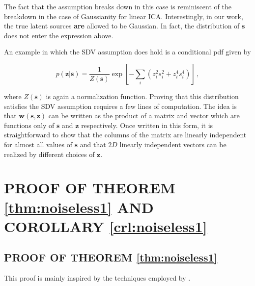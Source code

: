\documentclass[letterpaper]{article}
\theoremstyle{definition}
\begin{document}
The fact that the assumption breaks down in this case is reminiscent of the breakdown in the case of Gaussianity for linear ICA. Interestingly, in our work, the true latent sources \textbf{are} allowed to be Gaussian. In fact, the distribution of $\bm{s}$ does not enter the expression above.


An example in which the SDV assumption does hold is a conditional pdf given by

\begin{equation}
p(\bm{z}|\bm{s}) = \frac{1}{Z(\bm{s})} \exp \left[ - \sum_i (z_i^2  s_i^2 + z_i^4 s_i^4  ) \right]\,, \label{eq:satisfied}
\end{equation}

where $Z(\bm{s})$ is again a normalization function.
Proving that this distribution satisfies the SDV assumption requires a few lines of computation.
The idea is that $\bm{w}(\bm{s}, \bm{z})$ can be written as the product of a matrix and vector which are functions only of $\bm{s}$ and $\bm{z}$ respectively.
Once written in this form, it is straightforward to show that the columns of the matrix are linearly independent for almost all values of $\bm{s}$ and that $2D$ linearly independent vectors can be realized by different choices of $\bm{z}$.

\section{PROOF OF THEOREM \ref{thm:noiseless1} AND COROLLARY \ref{crl:noiseless1}}
\label{appendix:thm_noiseless}

\subsection{PROOF OF THEOREM \ref{thm:noiseless1}}\label{appendix:proof-thm1}
This proof is mainly inspired by the techniques employed by \cite{hyvarinen19a}.
\end{document}
